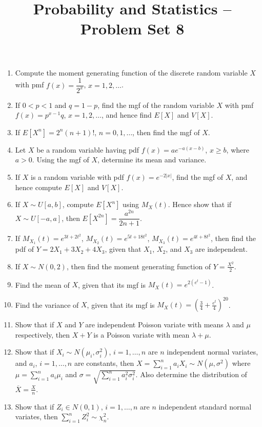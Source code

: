 \documentclass[svgnames]{amsart}
\title[]{Probability and Statistics -- Problem Set 8}
\begin{document}
\maketitle
\begin{enumerate}[leftmargin=*, itemsep=0.3em]
\item Compute the moment generating function of the discrete random variable $X$ with pmf $f(x) = \dfrac{1}{2^x}$, $x = 1, 2, \ldots$.

\item If $0 < p < 1$ and $q = 1 - p$, find the mgf of the random variable $X$ with pmf $f(x) = p^{x - 1} q$, $x = 1, 2, \ldots$, and hence find $E[X]$ and $V[X]$.

\item If $E[X^n] = 2^n (n + 1)!$, $n = 0, 1, \ldots$, then find the mgf of $X$.

\item Let $X$ be a random variable having pdf $f(x) = a e^{-a(x - b)}$, $x \ge b$, where $a > 0$. Using the mgf of $X$, determine its mean and variance.

\item If $X$ is a random variable with pdf $f(x) = e^{-2|x|}$, find the mgf of $X$, and hence compute $E[X]$ and $V[X]$.

\item If $X \sim U[a, b]$, compute $E[X^n]$ using $M_X(t)$. Hence show that if $X \sim U[-a, a]$, then $E[X^{2n}] = \dfrac{a^{2n}}{2n + 1}$.

\item If $M_{X_1}(t) = e^{3t + 2t^2}$, $M_{X_2}(t) = e^{5t + 18t^2}$, $M_{X_3}(t) = e^{4t + 8t^2}$, then find the pdf of $Y = 2X_1 + 3X_2 + 4X_3$, given that $X_1$, $X_2$, and $X_3$ are independent.

\item If $X \sim N(0, 2)$, then find the moment generating function of $Y = \frac{X^2}{2}$.

\item Find the mean of $X$, given that its mgf is $M_X(t) = e^{2(e^t - 1)}$.

\item Find the variance of $X$, given that its mgf is $M_X(t) = \left(\frac 3 4 + \frac{e^t}{4}\right)^{20}$.

\item Show that if $X$ and $Y$ are independent Poisson variate with means $\lambda$ and $\mu$ respectively, then $X + Y$ is a Poisson variate with mean $\lambda + \mu$.

\item Show that if $X_i \sim N(\mu_i, \sigma_i^2)$, $i = 1, \ldots, n$ are $n$ independent normal variates, and $a_i$, $i = 1, \ldots, n$ are constants, then $X = \sum_{i=1}^{n} a_i X_i \sim N(\mu, \sigma^2)$ where $\mu = \sum_{i = 1}^{n} a_i \mu_i$ and $\sigma = \sqrt{\sum_{i = 1}^n a_i^2 \sigma_i^2}$. Also determine the distribution of $\overline X = \frac X n$.

\item Show that if $Z_i \in N(0, 1)$, $i = 1, \ldots, n$ are $n$ independent standard normal variates, then $\sum_{i = 1}^n Z_i^2 \sim \chi^2_n$.

\end{enumerate}
\end{document}
